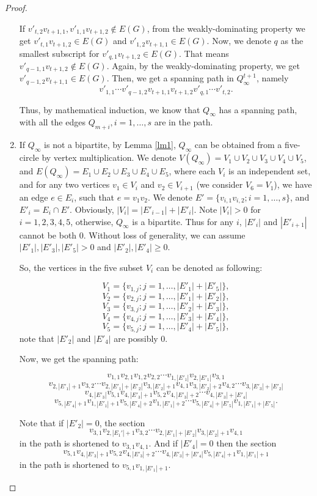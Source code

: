 \documentclass{amsart}
\begin{document}
\begin{proof}
\begin{enumerate}
If $v'_{t,2}v_{t+1,1},v'_{1,1}v_{t+1,2}\not\in E(G)$, from the weakly-dominating property we get $v'_{t,1}v_{t+1,2}\in E(G)$ and $v'_{1,2}v_{t+1,1}\in E(G)$. Now, we denote $q$ as the smallest subscript for $v'_{q,1}v_{t+1,2}\in E(G)$. That means $v'_{q-1,1}v_{t+1,2}\not\in E(G)$. Again, by the weakly-dominating property, we get $v'_{q-1,2}v_{t+1,1}\in E(G)$. Then, we get a spanning path in $Q^{t+1}_{\infty}$, namely $$v'_{1,1}\cdots v'_{q-1,2}v_{t+1,1}v_{t+1,2}v'_{q,1}\cdots v'_{t,2}.$$

Thus, by mathematical induction, we know that $Q_{\infty}$ has a spanning path, with all the edges $Q_{m+i},i=1,\ldots,s$ are in the path.

\item If $Q_{\infty}$ is not a bipartite, by Lemma \ref{lm1}, $Q_{\infty}$ can be obtained from a five-circle by vertex multiplication. We denote $V(Q_{\infty})=V_1\cup V_2\cup V_3\cup V_4\cup V_5$, and $E(Q_{\infty})=E_1\cup E_2\cup E_3\cup E_4\cup E_5$, where each $V_i$ is an independent set, and  for any two vertices $v_1\in V_i$ and $v_2\in V_{i+1}$ (we consider $V_6=V_1$), we have an edge $e\in E_i$, such that $e=v_1v_2$. We denote $E'=\{v_{i,1}v_{i,2};i=1,\ldots,s\}$, and $E'_i=E_i\cap E'$. Obviously, $|V_i|=|E'_{i-1}|+|E'_i|$. Note $|V_i|>0$ for $i=1,2,3,4,5$, otherwise, $Q_{\infty}$ is a bipartite. Thus for any $i$, $|E'_i|$ and $|E'_{i+1}|$ cannot be both 0. Without loss of generality, we can assume $|E'_1|,|E'_3|,|E'_5|>0$ and $|E'_2|,|E'_4|\ge0$.

 So, the vertices in the five subset $V_i$ can be denoted as following:

$$V_1=\{v_{1,j};j=1,\ldots,|E'_1|+|E'_5|\},$$
$$V_2=\{v_{2,j};j=1,\ldots,|E'_1|+|E'_2|\},$$
$$V_3=\{v_{3,j};j=1,\ldots,|E'_2|+|E'_3|\},$$
$$V_4=\{v_{4,j};j=1,\ldots,|E'_3|+|E'_4|\},$$
$$V_5=\{v_{5,j};j=1,\ldots,|E'_4|+|E'_5|\},$$
note that $|E'_2|$ and $|E'_4|$ are possibly 0.

Now, we get the spanning path:

$$v_{1,1}v_{2,1}v_{1,2}v_{2,2}\cdots v_{1,|E'_1|}v_{2,|E'_1|}v_{3,1}$$
$$v_{2,|E'_1|+1}v_{3,2}\cdots v_{2,|E'_1|+|E'_2|}v_{3,|E'_2|+1}v_{4,1}v_{3,|E'_2|+2}v_{4,2}\cdots v_{3,|E'_3|+|E'_2|}$$
$$v_{4,|E'_3|}v_{5,1}v_{4,|E'_3|+1}v_{5,2}v_{4,|E'_3|+2}\cdots v_{4,|E'_3|+|E'_4|}$$
$$v_{5,|E'_4|+1}v_{1,|E'_1|+1}v_{5,|E'_4|+2}v_{1,|E'_1|+2}\cdots v_{5,|E'_4|+|E'_5|}v_{1,|E'_1|+|E'_5|}.$$

Note that if $|E'_2|=0$, the section $$v_{3,1}v_{2,|E_1'|+1}v_{3,2}\cdots v_{2,|E'_1|+|E'_2|}v_{3,|E'_2|+1}v_{4,1}$$ in the path is shortened to $v_{3,1}v_{4,1}$. And if $|E'_4|=0$ then the section $$v_{5,1}v_{4,|E'_3|+1}v_{5,2}v_{4,|E'_3|+2}\cdots v_{4,|E'_3|+|E'_4|}v_{5,|E'_4|+1}v_{1,|E'_1|+1}$$ in the path is shortened to $v_{5,1}v_{1,|E'_1|+1}$.
\end{enumerate}\end{proof}
\end{document}
